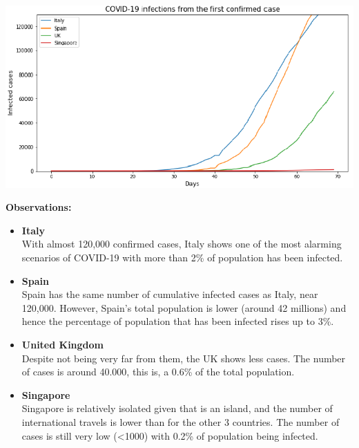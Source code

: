 \documentclass{article}
\begin{document}
\begin{itemize}
\begin{center}
\end{center}
\begin{center}
\includegraphics[scale=0.70]{corona_4_countries.png}
\end{center}
\textbf{Observations:}
\begin{itemize}
\item \textbf{Italy}
\\With almost 120,000 confirmed cases, Italy shows one of the most alarming scenarios of COVID-19  with more than 2\% of population has been infected.
\item \textbf{Spain}
\\Spain has the same number of cumulative infected cases as Italy, near 120,000. However, Spain's total population is lower (around 42 millions) and hence the percentage of population that has been infected rises up to 3\%.
\item \textbf{United Kingdom}
\\Despite not being very far from them, the UK shows less cases. The number of cases is around 40.000, this is, a 0.6\% of the total population.
\item \textbf{Singapore}
\\Singapore is relatively isolated given that is an island, and the number of international travels is lower than for the other 3 countries. The number of cases is still very low (<1000) with 0.2\% of population being infected.
\end{itemize}
\end{itemize}
\end{document}

